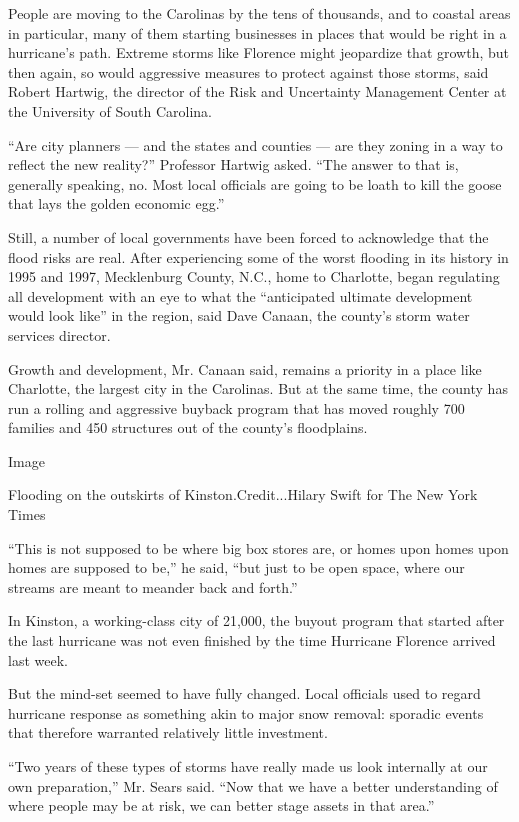 People are moving to the Carolinas by the tens of thousands, and to
coastal areas in particular, many of them starting businesses in places
that would be right in a hurricane's path. Extreme storms like Florence
might jeopardize that growth, but then again, so would aggressive
measures to protect against those storms, said Robert Hartwig, the
director of the Risk and Uncertainty Management Center at the University
of South Carolina.

``Are city planners --- and the states and counties --- are they zoning
in a way to reflect the new reality?'' Professor Hartwig asked. ``The
answer to that is, generally speaking, no. Most local officials are
going to be loath to kill the goose that lays the golden economic egg.''

Still, a number of local governments have been forced to acknowledge
that the flood risks are real. After experiencing some of the worst
flooding in its history in 1995 and 1997, Mecklenburg County, N.C., home
to Charlotte, began regulating all development with an eye to what the
``anticipated ultimate development would look like'' in the region, said
Dave Canaan, the county's storm water services director.

Growth and development, Mr. Canaan said, remains a priority in a place
like Charlotte, the largest city in the Carolinas. But at the same time,
the county has run a rolling and aggressive buyback program that has
moved roughly 700 families and 450 structures out of the county's
floodplains.

Image

Flooding on the outskirts of Kinston.Credit...Hilary Swift for The New
York Times

``This is not supposed to be where big box stores are, or homes upon
homes upon homes are supposed to be,'' he said, ``but just to be open
space, where our streams are meant to meander back and forth.''

In Kinston, a working-class city of 21,000, the buyout program that
started after the last hurricane was not even finished by the time
Hurricane Florence arrived last week.

But the mind-set seemed to have fully changed. Local officials used to
regard hurricane response as something akin to major snow removal:
sporadic events that therefore warranted relatively little investment.

``Two years of these types of storms have really made us look internally
at our own preparation,'' Mr. Sears said. ``Now that we have a better
understanding of where people may be at risk, we can better stage assets
in that area.''

